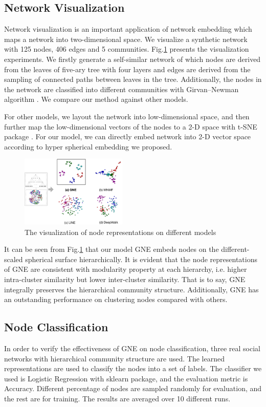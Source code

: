 \documentclass{article}
\theoremstyle{definition}
\begin{document}
	\subsection{Network Visualization}
	Network visualization is an important application of network embedding which maps a network into two-dimensional space. We visualize a synthetic network with 125 nodes, 406 edges and 5 communities. Fig.\ref{fig:visualization} presents the visualization experiments. We firstly generate a self-similar network of which nodes are derived from the leaves of five-ary tree with four layers and edges are derived from the sampling of connected paths between leaves in the tree. Additionally, the nodes in the network are classified into different communities with Girvan–Newman algorithm \cite{girvan2002community}. We compare our method against other models.

	For other models, we layout the network into low-dimensional space, and then further map the low-dimensional vectors of the nodes to a 2-D space with t-SNE package \cite{Maaten2008Visualizing}. For our model, we can directly embed network into 2-D vector space according to hyper spherical embedding we proposed.

	\begin{figure}[htb]
		\center
		\includegraphics[width=0.45\textwidth]{figure/visualization.pdf}
		\caption{The visualization of node representations on different models}
		\label{fig:visualization}
	\end{figure}
	It can be seen from Fig.\ref{fig:visualization} that our model GNE embeds nodes on the different-scaled spherical surface hierarchically. It is evident that the node representations of GNE are consistent with modularity property at each hierarchy, i.e. higher intra-cluster similarity but lower inter-cluster similarity. That is to say, GNE integrally preserves the hierarchical community structure. Additionally, GNE has an outstanding performance on clustering nodes compared with others.
	
	

	\subsection{Node Classification}
	In order to verify the effectiveness of GNE on node classification, three real social networks with hierarchical community structure are used. The learned representations are used to classify the nodes into a set of labels. The classifier we used is Logistic Regression with sklearn package, and the evaluation metric is Accuracy. Different percentage of nodes are sampled randomly for evaluation, and the rest are for training. The results are averaged over 10 different runs. 
\end{document}
